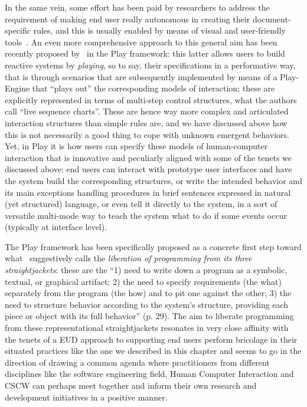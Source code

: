 \documentclass{article}
\begin{document}
In the same vein, some effort has been paid by researchers to address the requirement of making end user really autonomous in creating their document-specific rules, and this is usually enabled by means of visual and user-friendly tools~\citep[e.g., ][]{cabitza_rule-based_2012,krebs_combining_2012}. An even more comprehensive approach to this general aim has been recently proposed by~\citet{harel_come_2003} in the Play framework: this latter allows users to build reactive systems by \emph{playing}, so to say, their specifications in a performative way, that is through scenarios that are subsequently implemented by means of a Play-Engine that ``plays out'' the corresponding models of interaction; these are explicitly represented in terms of multi-step control structures, what the authors call ``live sequence charts''. These are hence way more complex and articulated interaction structures than simple rules are, and we have discussed above how this is not necessarily a good thing to cope with unknown emergent behaviors. Yet, in Play it is how users can specify these models of human-computer interaction that is innovative and peculiarly aligned with some of the tenets we discussed above: end users can interact with prototype user interfaces and have the system build the corresponding structures, or write the intended behavior and its main exceptions handling procedures in brief sentences expressed in natural (yet structured) language, or even tell it directly to the system, in a sort of versatile multi-mode way to teach the system what to do if some events occur (typically at interface level). 

The Play framework has been specifically proposed as a concrete first step toward what~\citet{harel_can_2008} suggestively calls the \emph{liberation of programming from its three straightjackets}: these are the ``1) need to write down a program as a symbolic, textual, or graphical artifact; 2) the need to specify requirements (the what) separately from the program (the how) and to pit one against the other; 3) the need to structure behavior according to the system's structure, providing each piece or object with its full behavior'' (p. 29). The aim to liberate programming from these representational straightjackets resonates in very close affinity with the tenets of a EUD approach to supporting end users perform bricolage in their situated practices like the one we described in this chapter and seems to go in the direction of drawing a common agenda where practitioners from different disciplines like the software engineering field, Human Computer Interaction and CSCW can perhaps meet together and inform their own research and development initiatives in a positive manner. 
\end{document}
